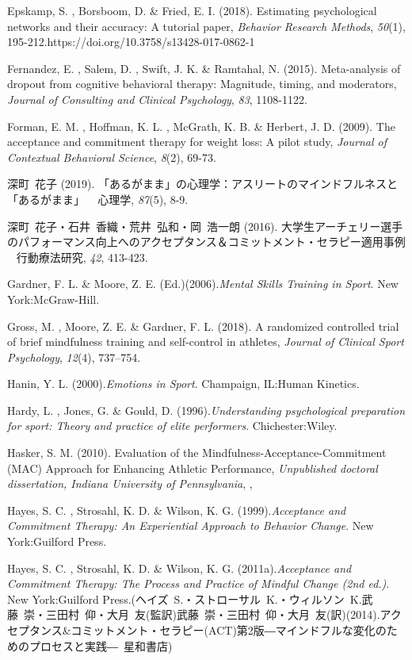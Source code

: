 \documentclass[12pt,a4paper,xelatex,ja=standard]{bxjsarticle}
\begin{document}
Epskamp, S. , Borsboom, D. \& Fried, E. I. (2018). Estimating
psychological networks and their accuracy: A tutorial paper,
\emph{Behavior Research Methods}, \emph{50}(1),
195-212.https://doi.org/10.3758/s13428-017-0862-1

Fernandez, E. , Salem, D. , Swift, J. K. \& Ramtahal, N. (2015).
Meta-analysis of dropout from cognitive behavioral therapy: Magnitude,
timing, and moderators,
\emph{Journal of Consulting and Clinical Psychology}, \emph{83},
1108-1122.

Forman, E. M. , Hoffman, K. L. , McGrath, K. B. \& Herbert, J. D.
(2009). The acceptance and commitment therapy for weight loss: A pilot
study, \emph{Journal of Contextual Behavioral Science}, \emph{8}(2),
69-73.

深町~花子 (2019).
「あるがまま」の心理学：アスリートのマインドフルネスと「あるがまま」 ~
心理学, \emph{87}(5), 8-9.

深町~花子・石井~香織・荒井~弘和・岡~浩一朗 (2016).
大学生アーチェリー選手のパフォーマンス向上へのアクセプタンス＆コミットメント・セラピー適用事例
~ 行動療法研究, \emph{42}, 413-423.

Gardner, F. L. \& Moore, Z. E.
(Ed.)(2006).\emph{Mental Skills Training in Sport}. New
York:McGraw-Hill.

Gross, M. , Moore, Z. E. \& Gardner, F. L. (2018). A randomized
controlled trial of brief mindfulness training and self-control in
athletes, \emph{Journal of Clinical Sport Psychology}, \emph{12}(4),
737--754.

Hanin, Y. L. (2000).\emph{Emotions in Sport}. Champaign, IL:Human
Kinetics.

Hardy, L. , Jones, G. \& Gould, D.
(1996).\emph{Understanding psychological preparation for sport: Theory and practice of elite performers}.
Chichester:Wiley.

Hasker, S. M. (2010). Evaluation of the
Mindfulness-Acceptance-Commitment (MAC) Approach for Enhancing Athletic
Performance,
\emph{Unpublished doctoral dissertation, Indiana University of Pennsylvania},
,

Hayes, S. C. , Strosahl, K. D. \& Wilson, K. G.
(1999).\emph{Acceptance and Commitment Therapy: An Experiential Approach to Behavior Change}.
New York:Guilford Press.

Hayes, S. C. , Strosahl, K. D. \& Wilson, K. G.
(2011a).\emph{Acceptance and Commitment Therapy: The Process and Practice of Mindful Change (2nd ed.)}.
New York:Guilford
Press.(ヘイズ~S.・ストローサル~K.・ウィルソン~K.武藤~崇・三田村~仰・大月~友(監訳)武藤~崇・三田村~仰・大月~友(訳)(2014).アクセプタンス\&コミットメント・セラピー(ACT)第2版―マインドフルな変化のためのプロセスと実践―~星和書店)
\end{document}
